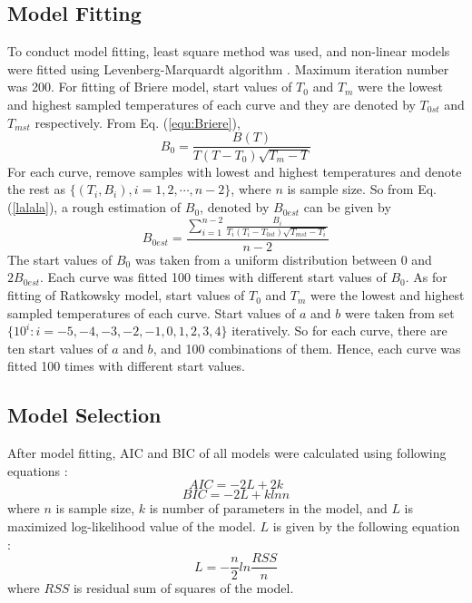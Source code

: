 \documentclass[11pt]{article}
\begin{document}
  \subsection{Model Fitting} 
    To conduct model fitting, least square method was used, and non-linear models were fitted using Levenberg-Marquardt  
    algorithm \cite{ranganathan2004levenberg, lourakis2005brief}. Maximum iteration number was 200.  
    \newline 
    For fitting of Briere model, start values of $T_0$ and $T_m$ were the lowest and highest sampled temperatures 
    of each curve and they are denoted by $T_{0st}$ and $T_{mst}$ respectively. From Eq. (\ref{equ:Briere}), 
    \begin{equation}\label{lalala} 
    B_0 = \frac{B(T)}{T (T - T_0) \sqrt{T_m - T}} 
    \end{equation} 
    For each curve, remove samples with lowest and highest temperatures and denote the rest as  
    $\{(T_i, B_i), i = 1,2,\cdots,n-2\}$, where $n$ is sample size.  
    So from Eq. (\ref{lalala}), a rough estimation of $B_0$, denoted by $B_{0est}$ can be given by  
    \begin{equation}\label{esti} 
    B_{0est} = \frac{\sum_{i=1}^{n-2}\frac{B_i}{T_i (T_i - T_{0st}) \sqrt{T_{mst} - T_i}}}{n-2} 
    \end{equation} 
    The start values of $B_0$ was taken from a uniform distribution between $0$ and $2B_{0est}$. 
    Each curve was fitted 100 times with different start values of $B_0$. 
    \newline 
    As for fitting of Ratkowsky model, start values of $T_0$ and $T_m$ were the lowest and highest sampled temperatures 
    of each curve. Start values of $a$ and $b$ were taken from set  
    $\{10^i: i = -5,-4,-3,-2,-1,0,1,2,3,4\}$ iteratively. So for each curve, there are ten start values of $a$ and $b$,  
    and 100 combinations of them. Hence, each curve was fitted 100 times with different start values.

  \subsection{Model Selection}
  After model fitting, AIC and BIC of all models  
  were calculated using  
  following equations \cite{johnson2004model}: 
  \begin{equation} 
  AIC = -2L + 2k 
  \end{equation} 
  \begin{equation} 
  BIC = -2L + klnn 
  \end{equation} 
  where $n$ is sample size, $k$ is number of parameters in the model, and $L$ is maximized log-likelihood value of the model. 
  $L$ is given by the following equation \cite{johnson2004model}: 
  \begin{equation} 
  L = -\frac{n}{2}ln\frac{RSS}{n} 
  \end{equation} 
  where $RSS$ is residual sum of squares of the model. 
 
\end{document}
